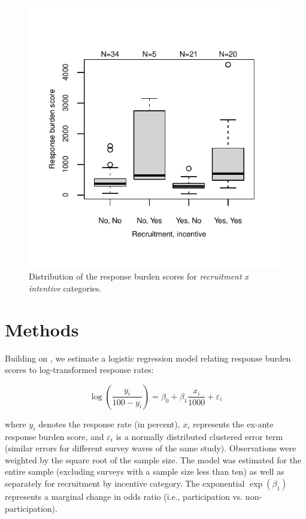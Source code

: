\documentclass[a4paper]{article}\usepackage[]{graphicx}\usepackage[]{xcolor}
\newenvironment{knitrout}{}{} %
\begin{document}
\begin{figure}
\begin{knitrout}
\color{fgcolor}

{\centering \includegraphics[width=0.5\linewidth]{figure/unnamed-chunk-14-1} 

}


\end{knitrout}
\caption{Distribution of the response burden scores for \textit{recruitment x intentive} categories.}
\label{fig:response_burden_scores}
\end{figure}

\section{Methods}

Building on \citet{axhausen2019predicting}, we estimate a logistic regression model relating response burden scores to log-transformed response rates:

\begin{equation}
\log \left( \frac{y_i}{100 - y_i} \right) = \beta_0 + \beta_1 \frac{x_i}{1000} + \varepsilon_i
\label{eq:response_burden}
\end{equation}

where $y_i$ denotes the response rate (in percent), $x_i$ represents the ex-ante response burden score, and $\varepsilon_i$ is a normally distributed clustered error term (similar errors for different survey waves of the same study). Observations were weighted by the square root of the sample size. The model was estimated for the entire sample (excluding surveys with a sample size less than ten) as well as separately for recruitment by incentive category. The exponential $\exp(\beta_1)$ represents a marginal change in odds ratio (i.e., participation vs. non-participation).
\end{document}
